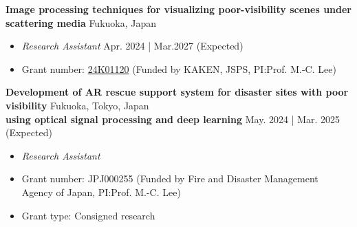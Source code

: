 \documentclass[a4paper,9pt]{extarticle}
\begin{document}
\noindent 
\textbf{Image processing techniques for visualizing poor-visibility scenes under scattering media} \hfill Fukuoka, Japan %
\begin{itemize}
    \item \textit{Research Assistant} \hfill Apr. 2024 | Mar.2027 (Expected)  
    \item Grant number: \href{https://kaken.nii.ac.jp/grant/KAKENHI-PROJECT-24K01120}{24K01120} (Funded by KAKEN, JSPS, PI:Prof. M.-C. Lee) %
\end{itemize}

\noindent 
\textbf{Development of AR rescue support system for disaster sites with poor visibility} \hfill Fukuoka, Tokyo, Japan\\%
\textbf{using optical signal processing and deep learning} \hfill May. 2024 | Mar. 2025 (Expected)
\begin{itemize}
    \item \textit{Research Assistant}  
    \item Grant number: JPJ000255 (Funded by Fire and Disaster Management Agency of Japan, PI:Prof. M.-C. Lee) 
    \item Grant type: Consigned research  %
\end{itemize}
\end{document}
